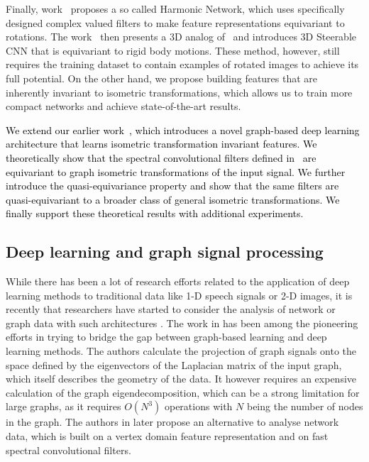 \documentclass[10pt,journal,compsoc]{IEEEtran}
\newcommand{\renata}[1]{\textcolor{black}{#1}}
\begin{document}
	Finally, work~\cite{bb:harm} proposes a so called Harmonic Network, which uses specifically designed complex valued filters to make feature representations equivariant to rotations. The work~\cite{bb:3dSteerableWeiler} then presents a 3D analog of~\cite{bb:harm}  and introduces 3D Steerable CNN that is equivariant to rigid body motions. These method, however, still requires the training dataset to contain examples of rotated images to achieve its full potential. On the other hand, we propose building features that are inherently invariant to isometric transformations, which allows us to train more compact networks and achieve state-of-the-art results.
	
	\renata{We extend our earlier work~\cite{bb:KhasanovaF17}, which introduces a novel graph-based deep learning architecture that learns isometric transformation invariant features. We theoretically show that the spectral convolutional filters defined in~\cite{bb:KhasanovaF17} are equivariant to graph isometric transformations of the input signal. We further introduce the quasi-equivariance property and show that the same filters are quasi-equivariant to a broader class of general isometric transformations. We finally support these theoretical results with additional experiments.}
	
	
	\subsection{Deep learning and graph signal processing}
	
	While there has been a lot of research efforts related to the application of deep learning methods to traditional data like 1-D speech signals or 2-D images, it is recently that researchers have started to consider the analysis of network or graph data with such architectures \cite{bb:kipf2016semi, bb:henaff2015deep, bb:nips_fingerprint, bb:Structural-RNN}.
	The work in \cite{bb:bruna-iclr-14} has been among the pioneering efforts in trying to bridge the gap between graph-based learning and deep learning methods. The authors calculate the projection of graph signals onto the space defined by the eigenvectors of the Laplacian matrix of the input graph, which itself describes the geometry of the data. It however requires an expensive calculation of the graph eigendecomposition, which can be a strong limitation for large graphs, as it requires $O(N^3)$ operations with $N$ being the number of nodes in the graph. The authors in \cite{bb:Mikhael} later propose an alternative to analyse network data, which is built on a vertex domain feature representation and on fast spectral convolutional filters. 
	
\end{document}
